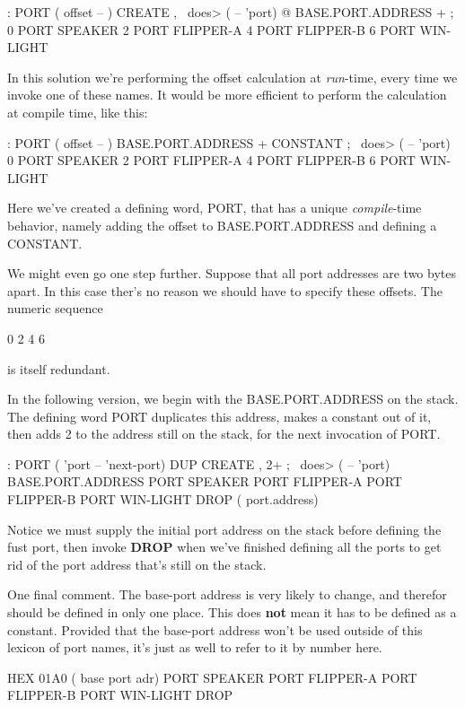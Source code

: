 \begin{Code}
: PORT  ( offset -- )  CREATE ,
   \ does>  ( -- 'port) @ BASE.PORT.ADDRESS + ;
0 PORT SPEAKER
2 PORT FLIPPER-A
4 PORT FLIPPER-B
6 PORT WIN-LIGHT
\end{Code}
In this solution we're performing the offset calculation at \emph{run}-time, every time we invoke one of these names. It would be more efficient to perform the calculation at compile time, like this:

\begin{Code}
: PORT  ( offset -- )  BASE.PORT.ADDRESS + CONSTANT ;
   \ does>  ( -- 'port)
0 PORT SPEAKER
2 PORT FLIPPER-A
4 PORT FLIPPER-B
6 PORT WIN-LIGHT
\end{Code}
Here we've created a defining word, PORT, that has a unique \emph{compile}-time behavior, namely adding the offset to BASE.PORT.ADDRESS and defining a CONSTANT.

We might even go one step further. Suppose that all port addresses are two bytes apart. In this case ther's no reason we should have to specify these offsets. The numeric sequence

\medskip

0 2 4 6

\medskip

\noindent
is itself redundant.

In the following version, we begin with the BASE.PORT.ADDRESS on the stack. The defining word PORT duplicates this address, makes a constant out of it, then adds 2 to the address still on the stack, for the next invocation of PORT.

\begin{Code}
: PORT   ( 'port -- 'next-port)  DUP CREATE ,  2+ ;
   \ does>  ( -- 'port)
BASE.PORT.ADDRESS
  PORT SPEAKER
  PORT FLIPPER-A
  PORT FLIPPER-B
  PORT WIN-LIGHT
DROP ( port.address)
\end{Code}
Notice we must supply the initial port address on the stack before defining the fust port, then invoke \textbf{DROP} when we've finished defining all the ports to get rid of the port address that's still on the stack.

One final comment. The base-port address is very likely to change, and therefor should be defined in only one place. This does \textbf{not} mean it has to be defined as a constant. Provided that the base-port address won't be used outside of this lexicon of port names, it's just as well to refer to it by number here.

\begin{Code}
HEX 01A0  ( base port adr)
  PORT SPEAKER
  PORT FLIPPER-A
  PORT FLIPPER-B
  PORT WIN-LIGHT
DROP
\end{Code}

